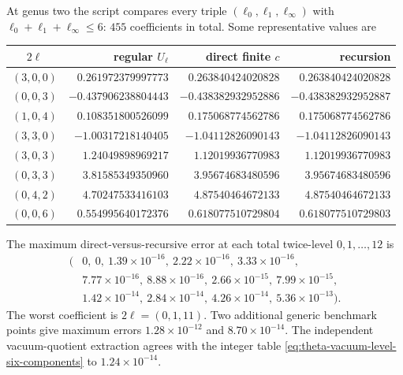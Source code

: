 \documentclass[11pt]{article}
\begin{document}
At genus two the script compares every triple
\((\ell_0,\ell_1,\ell_\infty)\) with
\(\ell_0+\ell_1+\ell_\infty\le6\): \(455\) coefficients in total.  Some
representative values are
\begin{center}
\begin{tabular}{@{}c r r r@{}}
\toprule
\(2\bm\ell\) & regular \(U_{\bm\ell}\) & direct finite \(c\)
& recursion\\
\midrule
\((3,0,0)\) & \(0.261972379997773\) & \(0.263840424020828\)
& \(0.263840424020828\)\\
\((0,0,3)\) & \(-0.437906238804443\) & \(-0.438382932952886\)
& \(-0.438382932952887\)\\
\((1,0,4)\) & \(0.108351800526099\) & \(0.175068774562786\)
& \(0.175068774562786\)\\
\((3,3,0)\) & \(-1.00317218140405\) & \(-1.04112826090143\)
& \(-1.04112826090143\)\\
\((3,0,3)\) & \(1.24049898969217\) & \(1.12019936770983\)
& \(1.12019936770983\)\\
\((0,3,3)\) & \(3.81585349350960\) & \(3.95674683480596\)
& \(3.95674683480596\)\\
\((0,4,2)\) & \(4.70247533416103\) & \(4.87540464672133\)
& \(4.87540464672133\)\\
\((0,0,6)\) & \(0.554995640172376\) & \(0.618077510729804\)
& \(0.618077510729803\)\\
\bottomrule
\end{tabular}
\end{center}
The maximum direct-versus-recursive error at each total twice-level
\(0,1,\ldots,12\) is
\begin{equation}
 \begin{aligned}
 (&0,\ 0,\ 1.39{\times}10^{-16},\ 2.22{\times}10^{-16},\
  3.33{\times}10^{-16},\\
 &7.77{\times}10^{-16},\ 8.88{\times}10^{-16},\
  2.66{\times}10^{-15},\ 7.99{\times}10^{-15},\\
 &1.42{\times}10^{-14},\ 2.84{\times}10^{-14},\
  4.26{\times}10^{-14},\ 5.36{\times}10^{-13}).
 \end{aligned}
 \label{eq:genus-two-error-by-level}
\end{equation}
The worst coefficient is \(2\bm\ell=(0,1,11)\).  Two additional generic
benchmark points give maximum errors \(1.28\times10^{-12}\) and
\(8.70\times10^{-14}\).  The independent vacuum-quotient extraction agrees
with the integer table \eqref{eq:theta-vacuum-level-six-components} to
\(1.24\times10^{-14}\).
\end{document}
